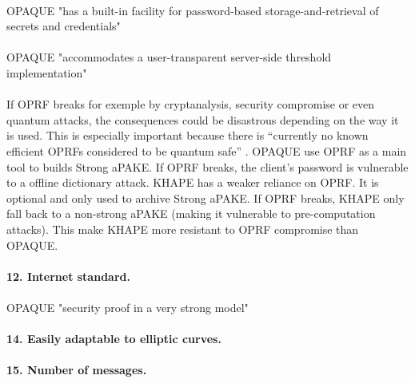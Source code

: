 \documentclass[../report.tex]{subfiles}
\begin{document}
\paragraph{}
OPAQUE "has a built-in facility for password-based storage-and-retrieval of secrets and credentials"

\paragraph{}
OPAQUE "accommodates a user-transparent server-side threshold implementation"

\paragraph{}
If OPRF breaks for exemple by cryptanalysis, security compromise or even quantum attacks, the consequences could be disastrous depending on the way it is used. This is especially important because there is ``currently no known efficient OPRFs considered to be quantum safe'' \cite{KHAPE_Paper}.
OPAQUE use OPRF as a main tool to builds Strong aPAKE. If OPRF breaks, the client's password is vulnerable to a offline dictionary attack.
KHAPE has a weaker reliance on OPRF. It is optional and only used to archive Strong aPAKE. If OPRF breaks, KHAPE only fall back to a non-strong aPAKE (making it vulnerable to pre-computation attacks). 
This make KHAPE more resistant to OPRF compromise than OPAQUE. 

\paragraph{12. Internet standard.}

\paragraph{}
OPAQUE "security proof in a very strong model"

\paragraph{14. Easily adaptable to elliptic curves.}


\paragraph{15. Number of messages.}
\end{document}
